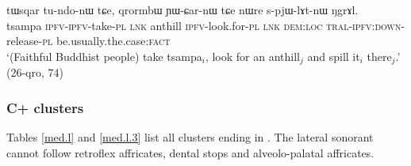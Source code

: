 \begin{exe}
	\ex \label{ex:spjWlAtnW}
	\gll tɯsqar tu-ndo-nɯ tɕe, qrormbɯ ɲɯ-ɕar-nɯ tɕe nɯre s-pjɯ-lɤt-nɯ ŋgrɤl. \\
	tsampa \textsc{ipfv}-\textsc{ipfv}-take-\textsc{pl} \textsc{lnk} anthill \textsc{ipfv}-look.for-\textsc{pl} \textsc{lnk} \textsc{dem}:\textsc{loc} \textsc{tral}-\textsc{ipfv}:\textsc{down}-release-\textsc{pl} be.usually.the.case:\textsc{fact} \\
	\glt `(Faithful Buddhist people) take tsampa$_i$, look for an anthill$_j$ and spill it$_i$ there$_j$.' (26-qro, 74)
\end{exe}

\subsubsection{C+ clusters} \label{sec:Cl.clusters}
Tables \ref{med.l} and \ref{med.l.3} list all clusters ending in . The lateral sonorant cannot follow retroflex affricates, dental stops and alveolo-palatal affricates.

